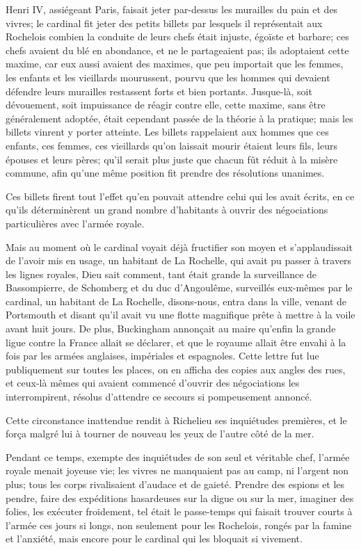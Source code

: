 Henri IV, assiégeant Paris, faisait jeter par-dessus les murailles du pain et des vivres; le cardinal fit jeter des petits billets par lesquels il représentait aux Rochelois combien la conduite de leurs chefs était injuste, égoïste et barbare; ces chefs avaient du blé en abondance, et ne le partageaient pas; ils adoptaient cette maxime, car eux aussi avaient des maximes, que peu importait que les femmes, les enfants et les vieillards mourussent, pourvu que les hommes qui devaient défendre leurs murailles restassent forts et bien portants. Jusque-là, soit dévouement, soit impuissance de réagir contre elle, cette maxime, sans être généralement adoptée, était cependant passée de la théorie à la pratique; mais les billets vinrent y porter atteinte. Les billets rappelaient aux hommes que ces enfants, ces femmes, ces vieillards qu'on laissait mourir étaient leurs fils, leurs épouses et leurs pères; qu'il serait plus juste que chacun fût réduit à la misère commune, afin qu'une même position fit prendre des résolutions unanimes. 

Ces billets firent tout l'effet qu'en pouvait attendre celui qui les avait écrits, en ce qu'ils déterminèrent un grand nombre d'habitants à ouvrir des négociations particulières avec l'armée royale. 

Mais au moment où le cardinal voyait déjà fructifier son moyen et s'applaudissait de l'avoir mis en usage, un habitant de La Rochelle, qui avait pu passer à travers les lignes royales, Dieu sait comment, tant était grande la surveillance de Bassompierre, de Schomberg et du duc d'Angoulême, surveillés eux-mêmes par le cardinal, un habitant de La Rochelle, disons-nous, entra dans la ville, venant de Portsmouth et disant qu'il avait vu une flotte magnifique prête à mettre à la voile avant huit jours. De plus, Buckingham annonçait au maire qu'enfin la grande ligue contre la France allait se déclarer, et que le royaume allait être envahi à la fois par les armées anglaises, impériales et espagnoles. Cette lettre fut lue publiquement sur toutes les places, on en afficha des copies aux angles des rues, et ceux-là mêmes qui avaient commencé d'ouvrir des négociations les interrompirent, résolus d'attendre ce secours si pompeusement annoncé. 

Cette circonstance inattendue rendit à Richelieu ses inquiétudes premières, et le força malgré lui à tourner de nouveau les yeux de l'autre côté de la mer. 

Pendant ce temps, exempte des inquiétudes de son seul et véritable chef, l'armée royale menait joyeuse vie; les vivres ne manquaient pas au camp, ni l'argent non plus; tous les corps rivalisaient d'audace et de gaieté. Prendre des espions et les pendre, faire des expéditions hasardeuses sur la digue ou sur la mer, imaginer des folies, les exécuter froidement, tel était le passe-temps qui faisait trouver courts à l'armée ces jours si longs, non seulement pour les Rochelois, rongés par la famine et l'anxiété, mais encore pour le cardinal qui les bloquait si vivement. 

